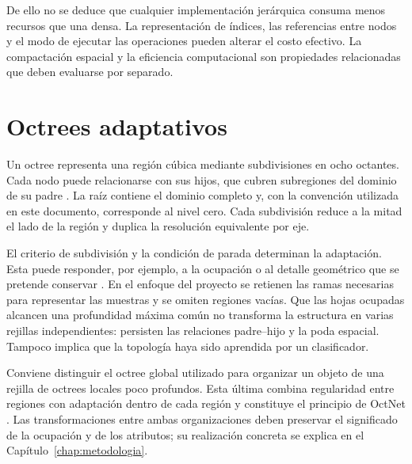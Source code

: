 De ello no se deduce que cualquier implementación jerárquica consuma menos recursos que una densa. La representación de índices, las referencias entre nodos y el modo de ejecutar las operaciones pueden alterar el costo efectivo. La compactación espacial y la eficiencia computacional son propiedades relacionadas que deben evaluarse por separado.

\section{Octrees adaptativos}
\label{sec:octrees}
Un octree representa una región cúbica mediante subdivisiones en ocho octantes. Cada nodo puede relacionarse con sus hijos, que cubren subregiones del dominio de su padre \parencite{meagher1982}. La raíz contiene el dominio completo y, con la convención utilizada en este documento, corresponde al nivel cero. Cada subdivisión reduce a la mitad el lado de la región y duplica la resolución equivalente por eje.

El criterio de subdivisión y la condición de parada determinan la adaptación. Esta puede responder, por ejemplo, a la ocupación o al detalle geométrico que se pretende conservar \parencite{samet}. En el enfoque del proyecto se retienen las ramas necesarias para representar las muestras y se omiten regiones vacías. Que las hojas ocupadas alcancen una profundidad máxima común no transforma la estructura en varias rejillas independientes: persisten las relaciones padre--hijo y la poda espacial. Tampoco implica que la topología haya sido aprendida por un clasificador.

Conviene distinguir el octree global utilizado para organizar un objeto de una rejilla de octrees locales poco profundos. Esta última combina regularidad entre regiones con adaptación dentro de cada región y constituye el principio de OctNet \parencite{riegler2017}. Las transformaciones entre ambas organizaciones deben preservar el significado de la ocupación y de los atributos; su realización concreta se explica en el Capítulo~\ref{chap:metodologia}.

